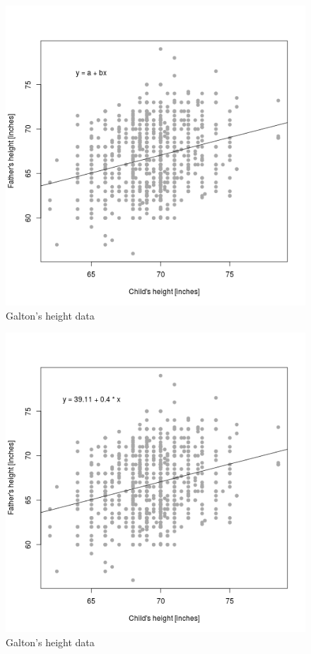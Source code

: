 \documentclass[12pt,twoside]{article}
\begin{document}
\begin{figure}[htbp]
\centering
\includegraphics{figure/galton2-1.png}
\caption{Galton's height data}
\end{figure}

\begin{figure}[htbp]
\centering
\includegraphics{figure/galton3-1.png}
\caption{Galton's height data}
\end{figure}
\end{document}
